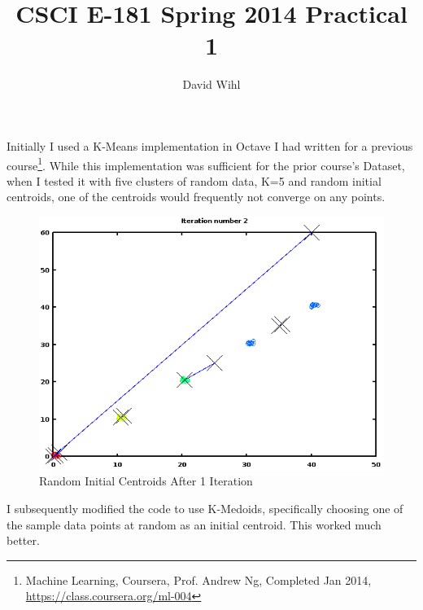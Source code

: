 \documentclass[11pt, oneside]{article}   	%
\title{CSCI E-181 Spring 2014 Practical 1}
\author{David Wihl}
\begin{document}
\maketitle

\par Initially I used a K-Means implementation in Octave I had written for a previous course\footnote{Machine Learning, Coursera, Prof. Andrew Ng, Completed Jan 2014, \url{https://class.coursera.org/ml-004}}.  While this implementation was sufficient for the prior course's Dataset, when I tested it with five clusters of random data, K=5 and random initial centroids, one of the centroids would frequently not converge on any points.

\begin{figure}[h!]
\centering
\includegraphics[scale=0.6]{randominitialClusters}
\caption{Random Initial Centroids After 1 Iteration}
\end{figure}

I subsequently modified the code to use K-Medoids, specifically choosing one of the sample data points at random as an initial centroid. This worked much better.
\end{document}
